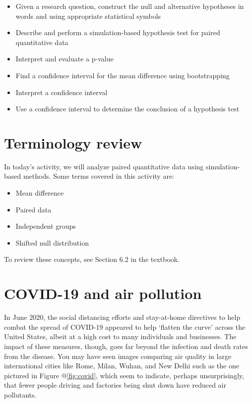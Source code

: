 \documentclass[
]{report}
\begin{document}
\begin{itemize}
\item
  Given a research question, construct the null and alternative hypotheses
  in words and using appropriate statistical symbols
\item
  Describe and perform a simulation-based hypothesis test for paired quantitative data
\item
  Interpret and evaluate a p-value
\item
  Find a confidence interval for the mean difference using bootstrapping
\item
  Interpret a confidence interval
\item
  Use a confidence interval to determine the conclusion of a hypothesis test
\end{itemize}

\hypertarget{terminology-review}{%
\section{Terminology review}\label{terminology-review}}

In today's activity, we will analyze paired quantitative data using simulation-based methods. Some terms covered in this activity are:

\begin{itemize}
\item
  Mean difference
\item
  Paired data
\item
  Independent groups
\item
  Shifted null distribution
\end{itemize}

To review these concepts, see Section 6.2 in the textbook.

\hypertarget{covid-19-and-air-pollution-1}{%
\section{COVID-19 and air pollution}\label{covid-19-and-air-pollution-1}}

In June 2020, the social distancing efforts and stay-at-home directives to help combat the spread of COVID-19 appeared to help `flatten the curve' across the United States, albeit at a high cost to many individuals and businesses. The impact of these measures, though, goes far beyond the infection and death rates from the disease. You may have seen images comparing air quality in large international cities like Rome, Milan, Wuhan, and New Delhi such as the one pictured in Figure @\ref{fig:covid}, which seem to indicate, perhaps unsurprisingly, that fewer people driving and factories being shut down have reduced air pollutants.
\end{document}
